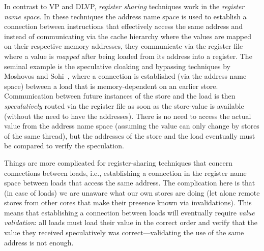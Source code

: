 \documentclass{sig-alternate}
\begin{document}
In contrast to VP and DLVP, \emph{register sharing} techniques work in the \emph{register name space}. In these techniques the address name space is used to establish a connection between instructions that effectively access the same address and instead of communicating via the cache hierarchy where the values are mapped on their respective memory addresses, they communicate via the register file where a value is \emph{mapped} after being loaded from its address into a register.
The seminal example is the speculative cloaking and bypassing techniques by Moshovos and Sohi~\cite{moshovos98}, where a connection is established (via the address name space) between a load that is memory-dependent on an earlier store. Communication between future instances of the store and the load is then \emph{speculatively} routed via the register file as soon as the store-value is available (without the need to have the addresses). There is no need to access the actual value from the address name space (assuming the value can only change by stores of the same thread), but the addresses of the store and the load eventually must be compared to verify the speculation. 

Things are more complicated for register-sharing techniques that concern connections between loads, i.e., establishing a connection in the register name space between loads that access the same address. The complication here is that (in case of loads) we are unaware what our own stores are doing (let alone remote stores from other cores that make their presence known via invalidations). This means that establishing a connection between loads will eventually require \emph{value validation}: all loads must load their value in the correct order and verify that the value they received speculatively was correct---validating the use of the same address is not enough.
\end{document}
